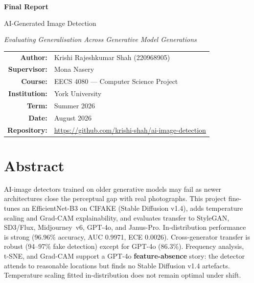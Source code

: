 \documentclass[12pt,a4paper]{article}
\begin{document}

\begin{titlepage}
\centering
\vspace*{2.5cm}
{\Huge\bfseries Final Report\par}
\vspace{1cm}
{\LARGE AI-Generated Image Detection\par}
\vspace{0.5cm}
{\large\itshape Evaluating Generalisation Across Generative Model Generations\par}
\vspace{2.5cm}

\begin{tabular}{rl}
\textbf{Author:}      & Krishi Rajeshkumar Shah (220968905) \\
\textbf{Supervisor:}   & Mona Nasery \\
\textbf{Course:}       & EECS 4080 --- Computer Science Project \\
\textbf{Institution:}  & York University \\
\textbf{Term:}         & Summer 2026 \\
\textbf{Date:}         & August 2026 \\
\textbf{Repository:}   & \url{https://github.com/krishi-shah/ai-image-detection} \\
\end{tabular}

\vfill
\end{titlepage}

\tableofcontents
\newpage
{}

\section{Abstract}

AI-image detectors trained on older generative models may fail as newer architectures close the perceptual gap with real photographs. This project fine-tunes an EfficientNet-B3 on CIFAKE (Stable Diffusion v1.4), adds temperature scaling and Grad-CAM explainability, and evaluates transfer to StyleGAN, SD3/Flux, Midjourney~v6, GPT-4o, and Janus-Pro. In-distribution performance is strong (96.96\% accuracy, AUC 0.9971, ECE 0.0026). Cross-generator transfer is robust (94--97\% fake detection) except for GPT-4o (86.3\%). Frequency analysis, t-SNE, and Grad-CAM support a GPT-4o \textbf{feature-absence} story: the detector attends to reasonable locations but finds no Stable Diffusion v1.4 artefacts. Temperature scaling fitted in-distribution does not remain optimal under shift.
\end{document}
